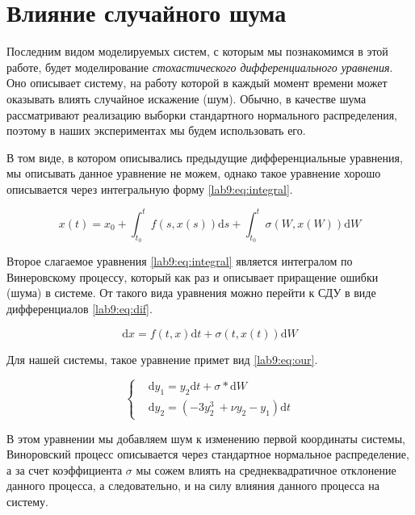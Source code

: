\chapter{Влияние случайного шума}\label{lab9}
Последним видом моделируемых систем, с которым мы познакомимся
в этой работе, будет моделирование \textit{стохастического
дифференциального уравнения}\cite{sdu}. Оно описывает систему, на работу
которой в каждый момент времени может оказывать влиять
случайное искажение (шум). Обычно, в качестве шума рассматривают
реализацию выборки стандартного нормального распределения,
поэтому в наших экспериментах мы будем использовать его.

В том виде, в котором описывались предыдущие дифференциальные
уравнения, мы описывать данное уравнение не можем, однако
такое уравнение хорошо описывается через интегральную форму
\eqref{lab9:eq:integral}.

\begin{equation}\label{lab9:eq:integral}
    x(t) = x_0 + \int_{t_0}^t f(s,x(s))\mathrm{d}s +
                 \int_{t_0}^t \sigma(W, x(W))\mathrm{d}W
\end{equation}

Второе слагаемое уравнения \eqref{lab9:eq:integral} является
интегралом по Винеровскому процессу, который как раз и
описывает приращение ошибки (шума) в системе. От такого вида
уравнения можно перейти к СДУ в виде дифференциалов
\eqref{lab9:eq:dif}.

\begin{equation}\label{lab9:eq:dif}
    \mathrm{d}x = f(t, x)\mathrm{d}t +
                  \sigma(t, x(t))\mathrm{d}W
\end{equation}

Для нашей системы, такое уравнение примет вид \eqref{lab9:eq:our}.

\begin{equation}\label{lab9:eq:our}
\begin{cases}
    &\mathrm{d}y_1 = y_2\mathrm{d}t + \sigma * \mathrm{d}W\\
    &\mathrm{d}y_2 = (-3y_2^3\ + \nu y_2 - y_1)\mathrm{d}t
\end{cases}
\end{equation}

В этом уравнении мы добавляем шум к изменению первой координаты
системы, Виноровский процесс описывается через стандартное
нормальное распределение, а за счет коэффициента $\sigma$ мы
сожем влиять на среднеквадратичное отклонение данного процесса,
а следовательно, и на силу влияния данного процесса на систему.

